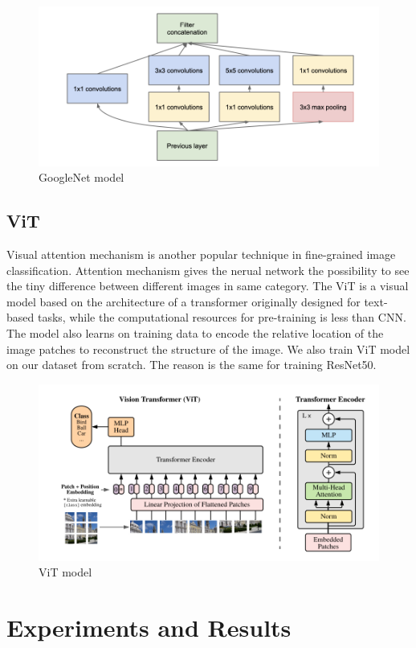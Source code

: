 \documentclass[conference]{IEEEtran}
\begin{document}
\begin{figure}[h]
\centering
  \includegraphics[width=0.8\linewidth]{googlenet_model.png}
\caption{GoogleNet model}
\end{figure}

\subsection{ViT}

Visual attention mechanism is another popular technique in fine-grained image classification. Attention mechanism gives the nerual network the possibility to see the tiny difference between different images in same category. The ViT is a visual model based on the architecture of a transformer originally designed for text-based tasks, while the computational
resources for pre-training is less than CNN. The model also learns on training data to encode the relative location of the image patches to reconstruct the structure of the image. We also train ViT model on our dataset from scratch. The reason is the same for training ResNet50.

\begin{figure}[h]
\centering
  \includegraphics[width=0.8\linewidth]{ViT_model.png}
\caption{ViT model}
\end{figure}

\section{Experiments and Results}
\end{document}
